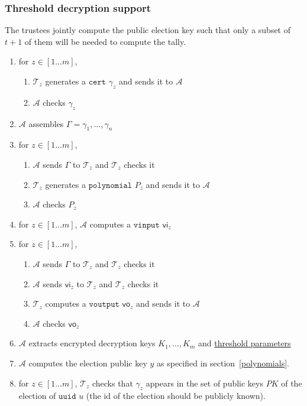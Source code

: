 \documentclass[a4paper]{article}
\newcommand{\uuid}{\texttt{uuid}}
\newcommand{\cert}{\texttt{cert}}
\newcommand{\poly}{\texttt{polynomial}}
\newcommand{\vinput}{\texttt{vinput}}
\newcommand{\voutput}{\texttt{voutput}}
\begin{document}
\subsubsection{Threshold decryption support}
\label{threshold}
The trustees jointly compute the public election key such that
only a subset of $t+1$  of them will be needed to compute the tally.

\begin{enumerate}
\item for $z\in[1\dots m]$,
  \begin{enumerate}
  \item $\mathcal{T}_z$ generates a \hyperref[certificates]{$\cert$} $\gamma_z$
    and sends it to $\mathcal{A}$
  \item $\mathcal{A}$ checks $\gamma_z$
  \end{enumerate}
\item $\mathcal{A}$ assembles $\Gamma=\gamma_1,\dotsc,\gamma_n$
\item for $z\in[1\dots m]$,
  \begin{enumerate}
  \item $\mathcal{A}$ sends $\Gamma$ to $\mathcal{T}_z$ and $\mathcal{T}_z$ checks it
  \item $\mathcal{T}_z$ generates a \hyperref[polynomials]{$\poly$} $P_z$ and
    sends it to $\mathcal{A}$
  \item $\mathcal{A}$ checks $P_z$
  \end{enumerate}
\item for $z\in[1\dots m]$, $\mathcal{A}$ computes a
  \hyperref[vinputs]{$\vinput$} $\textsf{vi}_z$
\item for $z\in[1\dots m]$,
  \begin{enumerate}
  \item $\mathcal{A}$ sends $\Gamma$ to $\mathcal{T}_z$ and $\mathcal{T}_z$ checks it
  \item $\mathcal{A}$ sends $\textsf{vi}_z$ to $\mathcal{T}_z$ and $\mathcal{T}_z$ checks it
  \item $\mathcal{T}_z$ computes a \hyperref[voutputs]{$\voutput$} $\textsf{vo}_z$ and
    sends it to $\mathcal{A}$
  \item $\mathcal{A}$ checks $\textsf{vo}_z$
  \end{enumerate}
\item $\mathcal{A}$ extracts encrypted decryption keys $K_1,\dots,K_m$ and
  \hyperref[threshold-params]{threshold parameters}
\item $\mathcal{A}$ computes the election public key $y$ as specified
  in section~\ref{polynomials}.
\item for $z\in[1\dots m]$,  $\mathcal{T}_z$ checks that $\gamma_z$ appears
    in the set of public keys $PK$ of the election of {$\uuid$} $u$ (the
    id of the election should be publicly known).
  \end{enumerate}
\end{document}
